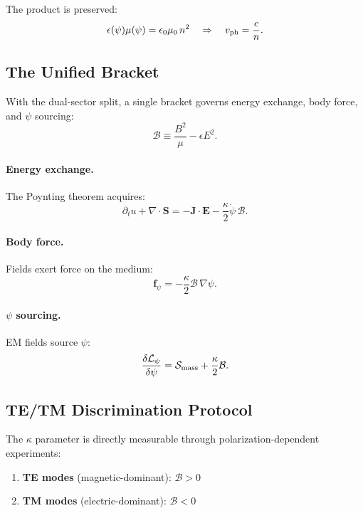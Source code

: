 \documentclass[aps,prd,twocolumn,superscriptaddress,floatfix,nofootinbib]{revtex4-2}
\begin{document}
The product is preserved:
\begin{equation}
\epsilon(\psi)\mu(\psi) = \epsilon_0\mu_0\,n^2
\quad \Rightarrow \quad v_{\rm ph} = \frac{c}{n}.
\end{equation}

\subsection{The Unified Bracket}

With the dual-sector split, a single bracket governs energy exchange,
body force, and $\psi$ sourcing:
\begin{equation}
\mathcal{B} \equiv \frac{B^2}{\mu} - \epsilon E^2.
\label{eq:bracket}
\end{equation}

\paragraph{Energy exchange.}
The Poynting theorem acquires:
\begin{equation}
\partial_t u + \nabla\cdot\mathbf{S} = -\mathbf{J}\cdot\mathbf{E}
- \frac{\kappa}{2}\dot\psi\,\mathcal{B}.
\end{equation}

\paragraph{Body force.}
Fields exert force on the medium:
\begin{equation}
\mathbf{f}_\psi = -\frac{\kappa}{2}\mathcal{B}\,\nabla\psi.
\end{equation}

\paragraph{$\psi$ sourcing.}
EM fields source $\psi$:
\begin{equation}
\frac{\delta\mathcal{L}_\psi}{\delta\psi} = \mathcal{S}_{\rm mass}
+ \frac{\kappa}{2}\mathcal{B}.
\end{equation}

\subsection{TE/TM Discrimination Protocol}

The $\kappa$ parameter is directly measurable through polarization-dependent
experiments:
\begin{enumerate}[nosep]
\item \textbf{TE modes} (magnetic-dominant): $\mathcal{B} > 0$
\item \textbf{TM modes} (electric-dominant): $\mathcal{B} < 0$
\end{enumerate}
\end{document}
